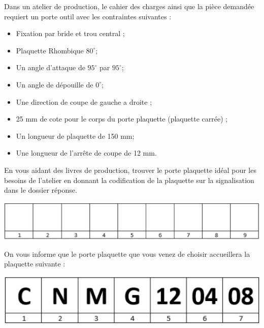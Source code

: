 \documentclass[12pt]{article}
\newcounter{exo}
\newenvironment{exo}{\stepcounter{exo}\vspace{0.5cm}{\bfseries Question \theexo\ :}}{\par\vspace{0.5cm}}
\begin{document}
\begin{tcolorbox}[colback=blue!5!white,colframe=red!75!black]
   \bcdodecaedre Dans un atelier de production, le cahier des charges ainsi que la pièce demandée requiert un porte outil avec les contraintes suivantes :

\begin{itemize}
\item Fixation par bride et trou central ;
\item Plaquette Rhombique $80^{\circ}$;
\item Un angle d'attaque de $95^{\circ}$ par $95^{\circ}$;
\item Un angle de dépouille de $0^{\circ}$;
\item Une direction de coupe de gauche a droite ;
\item 25 mm de cote pour le corps du porte plaquette (plaquette carrée) ;
\item Un longueur de plaquette de 150 mm;
\item Une longueur de l'arrête de coupe de 12 mm.
\end{itemize}
  
\end{tcolorbox}


\begin{exo} En vous aidant des livres de production, trouver le porte plaquette idéal pour les besoins de l'atelier en donnant la codification de la plaquette sur la signalisation dans le dossier réponse. \end{exo}
\begin{center}
\includegraphics[width=0.7\linewidth]{Images/PLA25.JPG}
\end{center}

\begin{tcolorbox}[colback=blue!5!white,colframe=red!75!black]
   \bcdodecaedre On vous informe que le porte plaquette que vous venez de choisir accueillera la plaquette suivante :
\begin{center}
\includegraphics[width=0.7\linewidth]{Images/PLA26.JPG}
\end{center}   
  
\end{tcolorbox}
\end{document}

